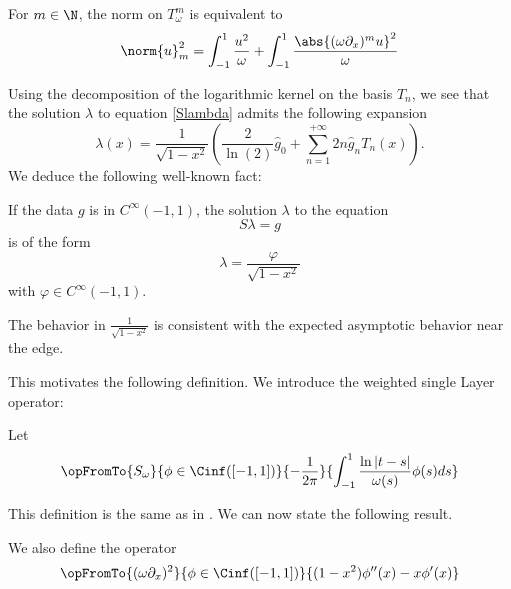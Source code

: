 \documentclass[]{article}
\begin{document}
\begin{Prop}
	For $m \in \N$, the norm on $T^m_\omega$ is equivalent to 
	\[\norm{u}_m^2 = \int_{-1}^{1}\frac{u^2}{\omega} + \int_{-1}^1 \dfrac{\abs{(\omega \partial_x)^m u}^2}{\omega}\]
\end{Prop}
Using the decomposition of the logarithmic kernel on the basis $T_n$, we see that the solution $\lambda$ to equation \eqref{Slambda} admits the following expansion 
	\[ \lambda(x) = \frac{1}{\sqrt{1-x^2}}\left( \dfrac{2}{\ln(2)}\hat{g}_0 + \sum_{n=1}^{+ \infty} 2n\hat{g}_n T_n(x)\right).\]
We deduce the following well-known fact:
\begin{Cor}
	If the data $g$ is in $C^{\infty}(-1,1)$, the solution $\lambda$ to the equation 
	\[S\lambda = g\]
	is of the form 
	\[\lambda = \dfrac{\varphi}{\sqrt{1-x^2}}\]
	with $\varphi \in C^{\infty}(-1,1)$.  
\end{Cor}
\begin{Rem}
	The behavior in $\frac{1}{\sqrt{1-x^2}}$ is consistent with the expected asymptotic behavior near the edge. 
\end{Rem}
This motivates the following definition. We introduce the weighted single Layer operator: 
\begin{Def}
	Let 
	\[\opFromTo{S_\omega}{\phi \in \Cinf([-1,1])}{-\dfrac{1}{2\pi}}{\int_{-1}^1\dfrac{\ln|t-s|}{\omega(s)} \phi(s)ds}\]
\end{Def}
This definition is the same as in \cite{bruno2012second}. We can now state the following result.
\begin{Def}
	We also define the operator 
	\[\opFromTo{(\omega\partial_x)^2}{\phi \in \Cinf([-1,1])}{(1-x^2)\phi''(x) - x \phi'(x)}\]
\end{Def}
\end{document}
